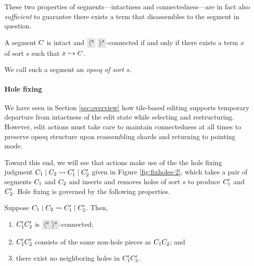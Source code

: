 These two properties of segments---intactness
and connectedness---are in fact also \emph{sufficient} to
guarantee there exists a term that disassembles to
the segment in question.

\begin{theorem} \label{thm:term-parseability}
  A segment $C$ is intact and $\lltip{s}~\rrtip{s}$-connected
  if and only if there exists a term $x$ of sort $s$ such that
  $x\hookrightarrow C$.
\end{theorem}
\noindent
We call such a segment an \emph{opseq of sort $s$}.

\paragraph{Hole fixing}
We have seen in Section \ref{sec:overview} how tile-based
editing supports temporary departure from intactness of
the edit state while selecting and restructuring.
However, edit actions must take care to maintain
connectedness at all times to preserve opseq structure
upon reassembling shards and returning to pointing mode.



Toward this end, we will see that actions make use of the the hole fixing judgment
$C_1\mid C_2\rightsquigarrow C'_1\mid C'_2$
given in Figure \ref{fig:fixholes-2},
which takes a pair of segments $C_1$ and $C_2$
and inserts and removes holes of sort $s$ to produce $C'_1$
and $C'_2$.
Hole fixing is governed by the following properties.

\begin{lemma}
  Suppose $C_1\mid C_2\rightsquigarrow C'_1\mid C'_2$.
  Then,
  \begin{enumerate}
    \item $C'_1C'_2$ is $\lltip{s}\rrtip{s}$-connected;
    \item $C'_1C'_2$ consists of the same non-hole pieces as
        $C_1C_2$; and
    \item there exist no neighboring holes in $C'_1C'_2$.
  \end{enumerate}
\end{lemma}

